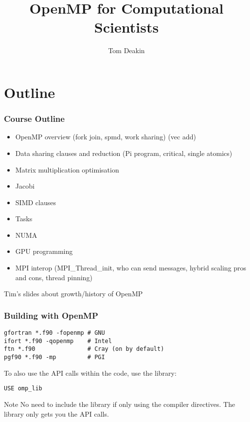 \documentclass{beamer}
\author{Tom Deakin}
\title{OpenMP for Computational Scientists}
\begin{document}
\frame{\titlepage}

\section{Outline}
\begin{frame}
\frametitle{Course Outline}
\begin{itemize}
  \item OpenMP overview (fork join, spmd, work sharing) (vec add)
  \item Data sharing clauses and reduction (Pi program, critical, single atomics)
  \item Matrix multiplication optimisation
  \item Jacobi
  \item SIMD clauses
  \item Tasks
  \item NUMA
  \item GPU programming
  \item MPI interop (MPI\_Thread\_init, who can send messages, hybrid scaling pros and cons, thread pinning)
\end{itemize}
\end{frame}

\begin{frame}
Tim's slides about growth/history of OpenMP
\end{frame}

\begin{frame}[fragile]
\frametitle{Building with OpenMP}

\begin{verbatim}
gfortran *.f90 -fopenmp # GNU
ifort *.f90 -qopenmp    # Intel
ftn *.f90               # Cray (on by default)
pgf90 *.f90 -mp         # PGI
\end{verbatim}

To also use the API calls within the code, use the library:
\begin{verbatim}
USE omp_lib
\end{verbatim}

\begin{alertblock}{Note}
No need to include the library if only using the compiler directives.
The library only gets you the API calls.
\end{alertblock}


\end{frame}

\end{document}
